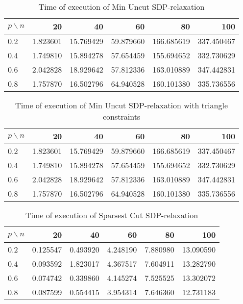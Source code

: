 \documentclass[12pt]{article}
\begin{document}
\begin{table}[H]
	\centering
	\begin{tabular}{|lrrrrr|}
		\toprule
		{$p \backslash n$} &       20  &        40  &        60  &         80  &         100 \\
		\midrule
		0.2 &  1.823601 &  15.769429 &  59.879660 &  166.685619 &  337.450467 \\
		0.4 &  1.749810 &  15.894278 &  57.654459 &  155.694652 &  332.730629 \\
		0.6 &  2.042828 &  18.929642 &  57.812336 &  163.010889 &  347.442831 \\
		0.8 &  1.757870 &  16.502796 &  64.940528 &  160.101380 &  335.736556 \\
		\bottomrule
	\end{tabular}
	\caption{Time of execution of Min Uncut SDP-relaxation}
\end{table}

\begin{table}[H]
	\centering
	\begin{tabular}{|lrrrrr|}
		\toprule
		{$p \backslash n$} &       20  &        40  &        60  &         80  &         100 \\
		\midrule
		0.2 &  1.823601 &  15.769429 &  59.879660 &  166.685619 &  337.450467 \\
		0.4 &  1.749810 &  15.894278 &  57.654459 &  155.694652 &  332.730629 \\
		0.6 &  2.042828 &  18.929642 &  57.812336 &  163.010889 &  347.442831 \\
		0.8 &  1.757870 &  16.502796 &  64.940528 &  160.101380 &  335.736556 \\
		\bottomrule
	\end{tabular}
	\caption{Time of execution of Min Uncut SDP-relaxation with triangle constraints}
\end{table}

\begin{table}[H]
	\centering
	\begin{tabular}{|lrrrrr|}
		\toprule
		{$p \backslash n$} &       20  &       40  &       60  &       80  &        100 \\
		\midrule
		0.2 &  0.125547 &  0.493920 &  4.248190 &  7.880980 &  13.090590 \\
		0.4 &  0.093592 &  1.823017 &  4.367517 &  7.604911 &  13.282790 \\
		0.6 &  0.074742 &  0.339860 &  4.145274 &  7.525525 &  13.302072 \\
		0.8 &  0.087599 &  0.554415 &  3.954314 &  7.646360 &  12.731183 \\
		\bottomrule
	\end{tabular}
	\caption{Time of execution of Sparsest Cut SDP-relaxation}
\end{table}
\end{document}
